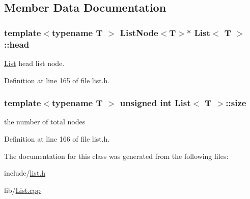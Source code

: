 \subsection{Member Data Documentation}
\hypertarget{class_list_a2b29518583aff577590c4f932824c5bf}{
\subsubsection[{head}]{\setlength{\rightskip}{0pt plus 5cm}template$<$typename T $>$ {\bf List\-Node}$<$T$>$$\ast$ {\bf List}$<$ T $>$\-::head\hspace{0.3cm}{\ttfamily [private]}}}\label{class_list_a2b29518583aff577590c4f932824c5bf}


\hyperlink{class_list}{List} head list node. 



Definition at line 165 of file list.\-h.

\hypertarget{class_list_a02655774bc5fa5f8bbff3d2b028525b0}{
\subsubsection[{size}]{\setlength{\rightskip}{0pt plus 5cm}template$<$typename T $>$ unsigned int {\bf List}$<$ T $>$\-::size\hspace{0.3cm}{\ttfamily [private]}}}\label{class_list_a02655774bc5fa5f8bbff3d2b028525b0}


the number of total nodes 



Definition at line 166 of file list.\-h.



The documentation for this class was generated from the following files\-:\begin{DoxyCompactItemize}
\item 
include/\hyperlink{list_8h}{list.\-h}\item 
lib/\hyperlink{_list_8cpp}{List.\-cpp}\end{DoxyCompactItemize}
